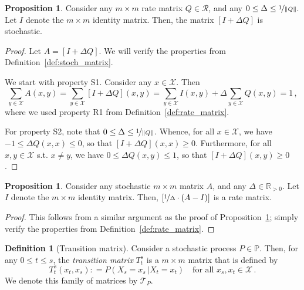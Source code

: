 \documentclass[10pt]{paper}
\theoremstyle{definition}
\newtheorem{proposition}[theorem]{Proposition}
\newtheorem{definition}{Definition}
\newcommand{\reals}{\mathbb{R}}
\newcommand{\realspos}{\reals_{>0}}
\newcommand{\states}{\mathcal{X}}
\newcommand{\processes}{\mathbb{P}}
\newcommand{\norm}[1]{\left\lVert #1 \right\rVert}
\newcommand{\coloneqq}{:\!=}
\begin{document}
\begin{proposition}\label{prop:stochastic_from_rate_matrix}
Consider any $m\times m$ rate matrix $Q\in\mathcal{R}$, and any $0\leq \Delta \leq \nicefrac{1}{\norm{Q}}$. Let $I$ denote the $m\times m$ identity matrix. Then, the matrix $[I+\Delta Q]$ is stochastic.
\end{proposition}
\begin{proof}
Let $A=[I+\Delta Q]$. We will verify the properties from Definition~\ref{def:stoch_matrix}.

We start with property S1. Consider any $x\in\states$. Then
\begin{equation*}
\sum_{y\in\states} A(x,y) = \sum_{y\in\states} [I + \Delta Q](x,y) = \sum_{y\in\states}I(x,y) + \Delta \sum_{y\in\states}Q(x,y) = 1\,,
\end{equation*}
where we used property R1 from Definition~\ref{def:rate_matrix}.

For property S2, note that $0\leq \Delta \leq \nicefrac{1}{\norm{Q}}$. Whence, for all $x\in\states$, we have $-1\leq \Delta Q(x,x) \leq 0$, so that $[I+\Delta Q](x,x) \geq 0$. Furthermore, for all $x,y\in\states$ s.t. $x\neq y$, we have $0\leq \Delta Q(x,y) \leq 1$, so that $[I+\Delta Q](x,y)\geq 0$.
\end{proof}

\begin{proposition}\label{prop:rate_from_stochastic_matrix}
Consider any stochastic $m\times m$ matrix $A$, and any $\Delta\in\realspos$. Let $I$ denote the $m\times m$ identity matrix. Then, $[\nicefrac{1}{\Delta}\cdot(A-I)]$ is a rate matrix.
\end{proposition}
\begin{proof}
This follows from a similar argument as the proof of Proposition~\ref{prop:stochastic_from_rate_matrix}; simply verify the properties from Definition~\ref{def:rate_matrix}.
\end{proof}

\begin{definition}[Transition matrix]\label{def:trans_matrix}
Consider a stochastic process $P\in\processes$. Then, for any $0\leq t\leq s$, the \emph{transition matrix} $T_t^s$ is a $m\times m$ matrix that is defined by
\begin{equation*}
T_t^s(x_t, x_s) \coloneqq P(X_s=x_s\,\vert X_t=x_t)\quad\text{for all $x_s,x_t\in\states$}\,.
\end{equation*}
We denote this family of matrices by $\mathcal{T}_P$.%
\end{definition}
\end{document}
